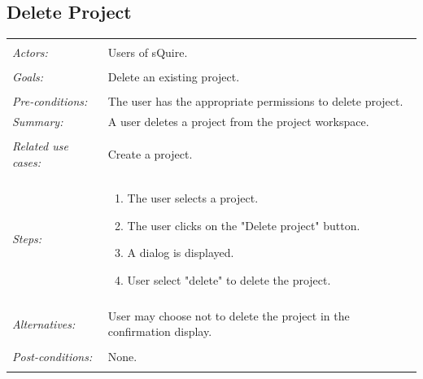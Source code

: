 \documentclass[11pt]{report}
\begin{document}
\subsection{Delete Project}
\begin{tabular}{ p{2cm} p{12cm} }
\hline
\\
\textit{Actors:} & Users of sQuire.\\
\\
\textit{Goals:} & Delete an existing project. \\
\\
\textit{Pre-conditions:} & The user has the appropriate permissions to delete project. 
\\
\textit{Summary:} & A user deletes a project from the project workspace.\\
\\
\textit{Related use cases:} & Create a project. \\
\\
\textit{Steps:} & \begin{enumerate}
 \item The user selects a project.
 \item The user clicks on the "Delete project" button. 
 \item A dialog is displayed. 
 \item User select "delete" to delete the project. 
 \end{enumerate}\\
 \\
 \textit{Alternatives:} & User may choose not to delete the project in the confirmation display.\\
 \\
 \textit{Post-conditions:} & None. \\
 \\
\hline
\end{tabular}
\end{document}
